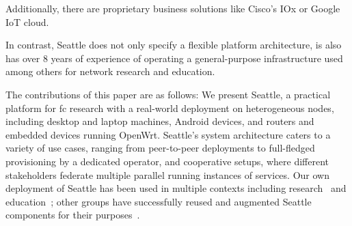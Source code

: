 Additionally, there are proprietary business solutions like Cisco's IOx or
Google IoT cloud.


In contrast, Seattle does not only specify a flexible platform architecture,
is also has over 8 years of experience of operating a general-purpose
infrastructure used among others for network research and education.

The contributions of this paper are as follows:
We present Seattle, a practical platform for \gls{fc} research
with a real-world deployment on heterogeneous nodes,
including desktop and laptop machines, Android devices,
and routers and embedded devices running OpenWrt.
Seattle's system architecture caters to a variety of use cases,
ranging from peer-to-peer deployments to full-fledged
provisioning by a dedicated operator, and cooperative setups,
where different stakeholders federate multiple parallel running
instances of services.
Our own deployment of Seattle has been used in multiple contexts
including research~\cite{li2015fence,rafetseder2013sensorium,zhuang2014sensibility,Eisl1010:Service,Tuts1010:Sustained,collares2011smart,zhuang2015privacy,cappos2014blursense,7133607} and education~\cite{Wallace_CCSC_2011,Cappos_CCSCCP_2010,Cappos_CCSCNW_2009,Cappos_SIGCSE_2014,Hooshangi_SIGCSE_2015};
other groups have successfully reused and augmented Seattle components
for their purposes~\cite{chard2010social,chard12ssc,caton2014social,muller2014tomato,tomato,eittenberger2012doubtless,zhuang2012distributed,zhuang2014taking,tredger2013building}.
